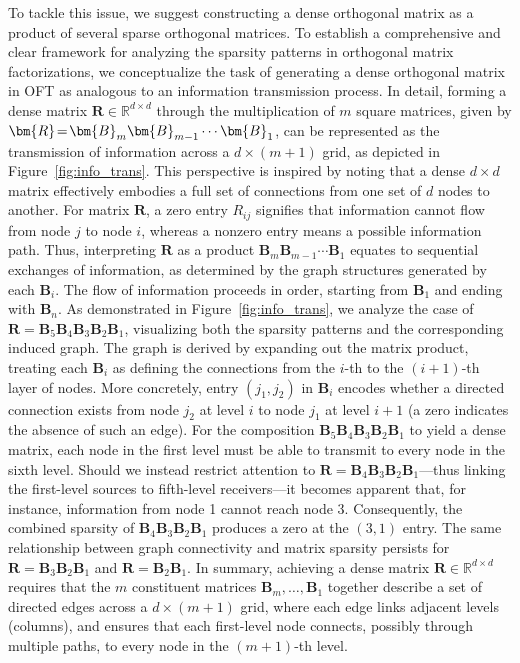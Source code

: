 To tackle this issue, we suggest constructing a dense orthogonal matrix as a product of several sparse orthogonal matrices. To establish a comprehensive and clear framework for analyzing the sparsity patterns in orthogonal matrix factorizations, we conceptualize the task of generating a dense orthogonal matrix in OFT as analogous to an information transmission process. In detail, forming a dense matrix $\bm{R}\in\mathbb{R}^{d\times d}$ through the multiplication of $m$ square matrices, given by $\thickmuskip=2mu \medmuskip=2mu \bm{R}=\bm{B}_m\bm{B}_{m-1}\cdots\bm{B}_1$, can be represented as the transmission of information across a $d\times (m+1)$ grid, as depicted in Figure~\ref{fig:info_trans}. This perspective is inspired by noting that a dense $d\times d$ matrix effectively embodies a full set of connections from one set of $d$ nodes to another. For matrix $\bm{R}$, a zero entry $R_{ij}$ signifies that information cannot flow from node $j$ to node $i$, whereas a nonzero entry means a possible information path. Thus, interpreting $\bm{R}$ as a product $\bm{B}_m\bm{B}_{m-1}\cdots\bm{B}_1$ equates to sequential exchanges of information, as determined by the graph structures generated by each $\bm{B}_i$. The flow of information proceeds in order, starting from $\bm{B}_1$ and ending with $\bm{B}_n$. As demonstrated in Figure~\ref{fig:info_trans}, we analyze the case of $\bm{R}=\bm{B}_5\bm{B}_4\bm{B}_3\bm{B}_2\bm{B}_1$, visualizing both the sparsity patterns and the corresponding induced graph. The graph is derived by expanding out the matrix product, treating each $\bm{B}_i$ as defining the connections from the $i$-th to the $(i+1)$-th layer of nodes. More concretely, entry $(j_1,j_2)$ in $\bm{B}_i$ encodes whether a directed connection exists from node $j_2$ at level $i$ to node $j_1$ at level $i+1$ (a zero indicates the absence of such an edge). For the composition $\bm{B}_5\bm{B}_4\bm{B}_3\bm{B}_2\bm{B}_1$ to yield a dense matrix, each node in the first level must be able to transmit to every node in the sixth level. Should we instead restrict attention to $\bm{R}=\bm{B}_4\bm{B}_3\bm{B}_2\bm{B}_1$—thus linking the first-level sources to fifth-level receivers—it becomes apparent that, for instance, information from node 1 cannot reach node 3. Consequently, the combined sparsity of $\bm{B}_4\bm{B}_3\bm{B}_2\bm{B}_1$ produces a zero at the $(3,1)$ entry. The same relationship between graph connectivity and matrix sparsity persists for $\bm{R}=\bm{B}_3\bm{B}_2\bm{B}_1$ and $\bm{R}=\bm{B}_2\bm{B}_1$. In summary, achieving a dense matrix $\bm{R}\in\mathbb{R}^{d\times d}$ requires that the $m$ constituent matrices $\bm{B}_m,\dots,\bm{B}_1$ together describe a set of directed edges across a $d\times (m+1)$ grid, where each edge links adjacent levels (columns), and ensures that each first-level node connects, possibly through multiple paths, to every node in the $(m+1)$-th level.

